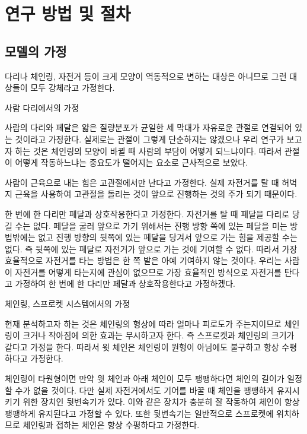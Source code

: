 \section{연구 방법 및 절차}

\subsection{모델의 가정}

다리나 체인링, 자전거 등이 크게 모양이 역동적으로 변하는 대상은 아니므로 그런 대상들이 모두 강체라고 가정한다.

사람 다리에서의 가정

사람의 다리와 페달은 얇은 질량분포가 균일한 세 막대가 자유로운 관절로 연결되어 있는 것이라고 가정한다. 실제로는 관절이 그렇게 단순하지는 않겠으나 우리 연구가 보고자 하는 것은 체인링의 모양이 바뀔 때 사람의 부담이 어떻게 되느냐이다. 따라서 관절이 어떻게 작동하느냐는 중요도가 떨어지는 요소로 근사적으로 보았다.

사람이 근육으로 내는 힘은 고관절에서만 난다고 가정한다. 실제 자전거를 탈 때 허벅지 근육을 사용하여 고관절을 돌리는 것이 앞으로 진행하는 것의 주가 되기 때문이다.

한 번에 한 다리만 페달과 상호작용한다고 가정한다. 자전거를 탈 때 페달을 다리로 당길 수는 없다. 페달을 굴러 앞으로 가기 위해서는 진행 방향 쪽에 있는 페달을 미는 방법밖에는 없고 진행 방향의 뒷쪽에 있는 페달을 당겨서 앞으로 가는 힘을 제공할 수는 없다. 즉 뒷쪽에 있는 페달로 자전거가 앞으로 가는 것에 기여할 수 없다. 따라서 가장 효율적으로 자전거를 타는 방법은 한 쪽 발은 아예 기여하지 않는 것이다. 우리는 사람이 자전거를 어떻게 타는지에 관심이 없으므로 가장 효율적인 방식으로 자전거를 탄다고 가정하여 한 번에 한 다리만 페달과 상호작용한다고 가정하겠다.

체인링, 스프로켓 시스템에서의 가정

현재 분석하고자 하는 것은 체인링의 형상에 따라 얼마나 피로도가 주는지이므로 체인링이 크거나 작아짐에 의한 효과는 무시하고자 한다. 즉 스프로켓과 체인링의 크기가 같다고 가정을 한다. 따라서 윗 체인은 체인링이 원형이 아님에도 불구하고 항상 수평하다고 가정한다.

체인링이 타원형이면 만약 윗 체인과 아래 체인이 모두 팽팽하다면 체인의 길이가 일정할 수가 없을 것이다. 다만 실제 자전거에서도 기어를 바꿀 때 체인을 팽팽하게 유지시키기 위한 장치인 뒷변속기가 있다. 이와 같은 장치가 충분히 잘 작동하여 체인이 항상 팽팽하게 유지된다고 가정할 수 있다. 또한 뒷변속기는 일반적으로 스프로켓에 위치하므로 체인링과 접하는 체인은 항상 수평하다고 가정한다.


